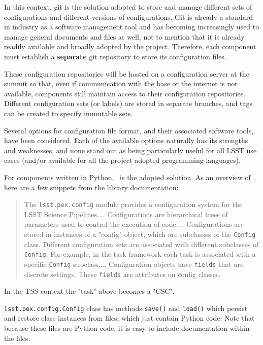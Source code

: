 In this context, git is the solution adopted to store and manage different sets of configurations and different versions of configurations. Git is already a standard in industry as a software management tool and has becoming increasingly used to manage general documents and files as well, not to mention that it is already readily available and broadly adopted by the project. Therefore, each component must establish a {\bf separate} git repository to store its configuration files. 

These configuration repositories will be hosted on a configuration server at the summit so that, even if communication with the base or the internet is not available, components still maintain access to their configuration repositories. Different configuration sets (or labels) are stored in separate branches, and tags can be created to specify immutable sets. 

Several options for configuration file format, and their associated software tools, have been considered. Each of the available options naturally has its strengths and weaknesses, and none stand out as being particularly useful for all LSST use cases (and/or available for all the project adopted programming languages).

For components written in Python, \pexC~is the adopted solution. As an overview of \pexC, here are a few snippets from the library documentation:

\begin{quotation}
The \texttt{lsst.pex.config} module provides a configuration system for the LSST Science Pipelines.... Configurations are hierarchical trees of parameters used to control the execution of code.... Configurations are stored in instances of a "config" object, which are subclasses of the \texttt{Config} class. Different configuration sets are associated with different subclasses of \texttt{Config}. For example, in the task framework each task is associated with a specific \texttt{Config} subclass.... Configuration objects have \texttt{fields} that are discrete settings. These \texttt{fields} are attributes on config classes.
\end{quotation}

In the TSS context the "task" above becomes a "CSC". 

\texttt{lsst.pex.config.Config} class has methods \texttt{save()} and \texttt{load()} which persist and restore class instances from files, which just contain Python code. Note that because these files are Python code, it is easy to include documentation within the files.


